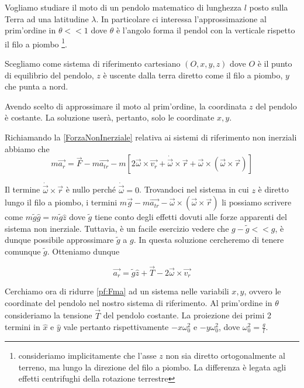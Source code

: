 \documentclass[../main.tex]{subfiles}
\begin{document}

\textex

Vogliamo studiare il moto di un pendolo matematico di lunghezza $l$ posto sulla Terra ad una latitudine $\lambda$.
In particolare ci interessa l'approssimazione al prim'ordine in $\theta << 1 $ dove $\theta$ è l'angolo forma il pendol
con la verticale rispetto il filo a piombo
\footnote{consideriamo implicitamente che l'asse $z$ non sia diretto ortogonalmente al terreno,
ma lungo la direzione del filo a piombo. La differenza è legata agli effetti centrifughi della rotazione terrestre}.

\solution
Scegliamo come sistema di riferimento cartesiano $(O, x,y,z)$ dove $O$ è il punto di equilibrio del pendolo, $z$ è uscente
dalla terra diretto come il filo a piombo, $y$ che punta a nord.

Avendo scelto di approssimare il moto al prim'ordine, la coordinata $z$ del pendolo è costante. La soluzione userà, pertanto,
solo le coordinate $x,y$.

Richiamando la \cref{ForzaNonInerziale} relativa ai sistemi di riferimento non inerziali abbiamo che 
\[
  m\vec{a_r}=\vec{F}-m\vec{a_{tr}}-m\left[2\vec{\omega}\times\vec{v_r}+\dot{\vec{\omega}}\times\vec{r}+
  \vec{\omega}\times(\vec{\omega}\times\vec{r})\right]
\]

Il termine $\dot{\vec{\omega}}\times\vec{r}$ è nullo perché $\dot{\vec{\omega}}=0$.
Trovandoci nel sistema in cui $z$ è diretto lungo il filo a piombo, i termini
$m\vec{g}-m\overrightarrow{a_{tr}}-\vec{\omega}\times(\vec{\omega}\times\vec{r})$ li possiamo scrivere come
$m\tilde{g}\hat{g} = m\tilde{g}\hat{z}$ dove $\tilde{g}$ tiene conto degli effetti
dovuti alle forze apparenti del sistema non inerziale. Tuttavia, è un facile esercizio vedere che $g-\tilde{g}<< g$, è dunque
possibile approssimare $\tilde{g}$ a $g$. In questa soluzione cercheremo di tenere comunque $\tilde{g}$. Otteniamo dunque

\begin{equation}
 \label{pf:Fma}
  \vec{a_r}=\tilde{g}\hat{z}+\vec{T}-2\vec{\omega}\times\vec{v_r} 
\end{equation}


Cerchiamo ora di ridurre \cref{pf:Fma} ad un sistema nelle variabili $x,y$, ovvero le coordinate del pendolo nel nostro sistema di riferimento.
Al prim'ordine in $\theta$ consideriamo la tensione $\vec{T}$ del pendolo costante. La proiezione dei primi 2 termini in $\hat{x}$ e $\hat{y}$
vale pertanto rispettivamente $-x\omega^2_0$ e $-y\omega^2_0$, dove $\omega^2_0 = \frac{g}{l}$.
\end{document}
